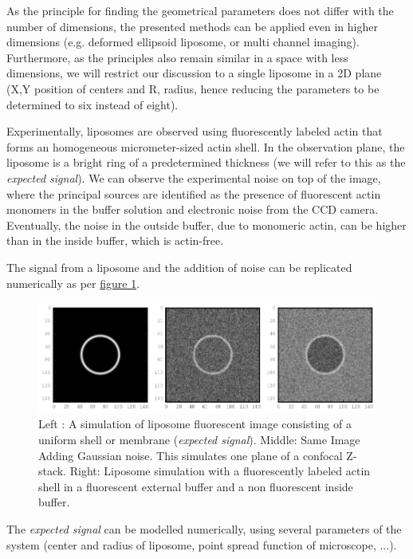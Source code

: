 \documentclass[A4paperpaper,11pt,english]{sphinxmanual}
\begin{document}
As the principle for finding the geometrical parameters does not differ with the
number of dimensions, the presented methods can be applied even in higher dimensions (e.g. deformed
ellipsoid liposome, or multi channel imaging). Furthermore, as the principles also remain  similar in a
space with less dimensions, we will restrict our discussion to a single liposome
in a 2D plane (X,Y position of centers and R, radius, hence reducing the parameters to be determined to six instead of eight).

Experimentally, liposomes are observed using fluorescently labeled actin that
forms an homogeneous micrometer-sized actin shell. In the observation plane,
the liposome is a bright ring of a predetermined thickness (we will refer to this as the
\emph{expected signal}). We can observe the experimental noise on top of the image, where the
principal sources are identified as the presence of fluorescent actin monomers in the
buffer solution and electronic noise from the CCD camera.
Eventually, the noise in the outside buffer, due to monomeric actin, can be higher than in the inside buffer, which is actin-free.

The signal from a liposome and the addition of noise can be replicated
numerically as per \hyperref[index-latex:fig-2d-sim]{figure  \ref*{index-latex:fig-2d-sim}}.
\begin{figure}[htbp]
\centering
\capstart

\includegraphics{modl-2D-doublet.png}
\caption{Left : A simulation of liposome fluorescent image consisting of a uniform shell or membrane
(\emph{expected signal}).  Middle: Same Image Adding Gaussian noise. This simulates
one plane of a confocal Z-stack.  Right: Liposome simulation   with
a fluorescently labeled actin shell in a fluorescent external buffer and a non
fluorescent inside buffer.}\label{index-latex:fig-2d-sim}\end{figure}

The \emph{expected signal} can be modelled numerically, using several parameters of
the system (center and radius of liposome, point spread function of microscope,
...).
\end{document}
